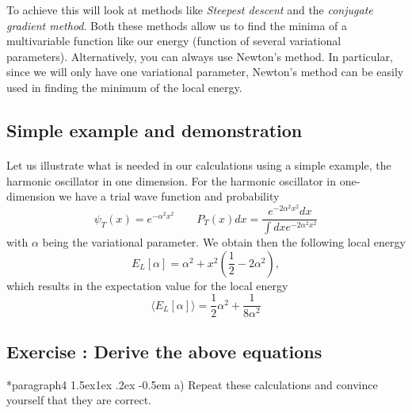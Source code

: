 \documentclass[%
twoside,                 %
final,                   %
10pt]{article}
\makeatletter
\newenvironment{doconceexercise}{}{}
\newcounter{doconceexercisecounter}
\newcommand\subex{\@startsection*{paragraph}{4}{\z@}%
                  {1.5ex\@plus1ex \@minus.2ex}%
                  {-0.5em}%
                  {\normalfont\normalsize\bfseries}}
\makeatother
\begin{document}
\noindent
To achieve this will look at methods like \emph{Steepest descent} and the \emph{conjugate gradient method}. Both these methods allow us to find
the minima of a multivariable  function like our energy (function of several variational parameters). 
Alternatively, you can always use Newton's method. In particular, since we will only have one variational parameter,
Newton's method can be easily used in finding the minimum of the local energy.



\subsection*{Simple example and demonstration}

\paragraph{}
Let us illustrate what is needed in our calculations using a simple example, the harmonic oscillator in one dimension.
For the harmonic oscillator in one-dimension we have a  trial wave function and probability
\begin{equation*}
\psi_T(x) = e^{-\alpha^2 x^2} \qquad P_T(x)dx = \frac{e^{-2\alpha^2 x^2}dx}{\int dx e^{-2\alpha^2 x^2}}
\end{equation*}
with $\alpha$ being the variational parameter. 
We obtain then the following local energy
\begin{equation*}
E_L[\alpha] = \alpha^2+x^2\left(\frac{1}{2}-2\alpha^2\right),
\end{equation*}
which results in the expectation value for the local energy
\begin{equation*}
\langle  E_L[\alpha]\rangle = \frac{1}{2}\alpha^2+\frac{1}{8\alpha^2}
\end{equation*}





\begin{doconceexercise}

\subsection*{Exercise \thedoconceexercisecounter: Derive the above equations}



\subex{a)}
Repeat these calculations and convince yourself that they are correct.


\end{doconceexercise}
\end{document}
